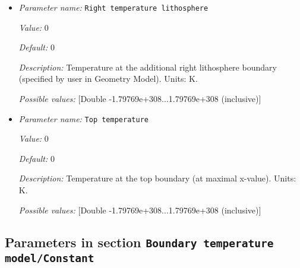 \begin{itemize}
{\it Value:} 0


{\it Default:} 0


{\it Description:} Temperature at the right boundary (at maximal x-value). Units: K.


{\it Possible values:} [Double -1.79769e+308...1.79769e+308 (inclusive)]
\item {\it Parameter name:} {\tt Right temperature lithosphere}
\label{parameters:Boundary temperature model/Box with lithosphere boundary indicators/Right temperature lithosphere}


{\it Value:} 0


{\it Default:} 0


{\it Description:} Temperature at the additional right lithosphere boundary (specified by user in Geometry Model). Units: K.


{\it Possible values:} [Double -1.79769e+308...1.79769e+308 (inclusive)]
\item {\it Parameter name:} {\tt Top temperature}
\label{parameters:Boundary temperature model/Box with lithosphere boundary indicators/Top temperature}


{\it Value:} 0


{\it Default:} 0


{\it Description:} Temperature at the top boundary (at maximal x-value). Units: K.


{\it Possible values:} [Double -1.79769e+308...1.79769e+308 (inclusive)]
\end{itemize}

\subsection{Parameters in section \tt Boundary temperature model/Constant}
\label{parameters:Boundary_20temperature_20model/Constant}

